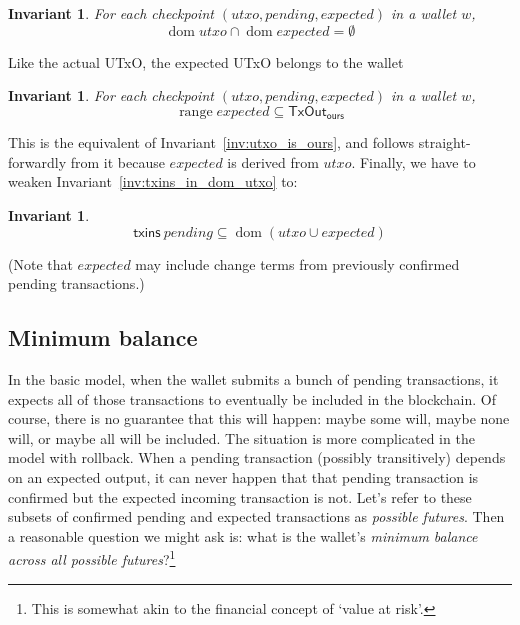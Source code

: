 \documentclass{article}
\DeclareMathOperator{\dom}{dom}
\DeclareMathOperator{\range}{range}
\newtheorem{invariant}[lemma]{Invariant}
\numberwithin{equation}{lemma}
\begin{document}
\begin{invariant}
For each checkpoint $(\mathit{utxo}, \mathit{pending}, \mathit{expected})$ in a wallet $w$,
\begin{equation*}
\dom \mathit{utxo} \cap \dom \mathit{expected} = \emptyset
\end{equation*}
\end{invariant}

Like the actual UTxO, the expected UTxO belongs to the wallet

\begin{invariant}
For each checkpoint $(\mathit{utxo}, \mathit{pending}, \mathit{expected})$ in a wallet $w$,
\begin{equation*}
\range \mathit{expected} \subseteq \mathsf{TxOut}_\mathsf{ours}
\end{equation*}
\end{invariant}

This is the equivalent of Invariant~\ref{inv:utxo_is_ours}, and follows
straight-forwardly from it because $\mathit{expected}$ is derived from
$\mathit{utxo}$. Finally, we have to weaken
Invariant~\ref{inv:txins_in_dom_utxo} to:

\begin{invariant}
\begin{equation*}
\mathsf{txins} ~ \mathit{pending} \subseteq \dom (\mathit{utxo} \cup \mathit{expected})
\end{equation*}
\label{inv:txins_in_dom_utxo_expected_pending}
\end{invariant}

(Note that $\mathit{expected}$ may include change terms from previously
confirmed pending transactions.)

\subsection{Minimum balance}

In the basic model, when the wallet submits a bunch of pending transactions, it
expects all of those transactions to eventually be included in the blockchain.
Of course, there is no guarantee that this will happen: maybe some will, maybe
none will, or maybe all will be included. The situation is more complicated in
the model with rollback. When a pending transaction (possibly transitively)
depends on an expected output, it can never happen that that pending transaction
is confirmed but the expected incoming transaction is not. Let's refer to these
subsets of confirmed pending and expected transactions as \emph{possible futures}.
Then a reasonable question we might ask is: what is the wallet's \emph{minimum
balance across all possible futures}?\footnote{This is somewhat akin to the
financial concept of `value at risk'.}
\end{document}

